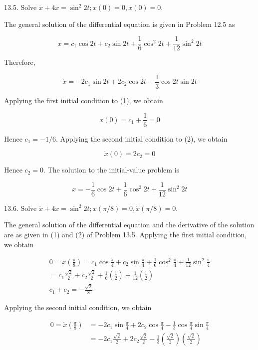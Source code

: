 \documentclass[10pt]{article}
\begin{document}
13.5. Solve $\ddot{x}+4 x=\sin ^{2} 2 t ; x(0)=0, \dot{x}(0)=0$.

The general solution of the differential equation is given in Problem 12.5 as


\begin{equation*}
x=c_{1} \cos 2 t+c_{2} \sin 2 t+\frac{1}{6} \cos ^{2} 2 t+\frac{1}{12} \sin ^{2} 2 t \tag{1}
\end{equation*}


Therefore,


\begin{equation*}
\dot{x}=-2 c_{1} \sin 2 t+2 c_{2} \cos 2 t-\frac{1}{3} \cos 2 t \sin 2 t \tag{2}
\end{equation*}


Applying the first initial condition to (1), we obtain

$$
x(0)=c_{1}+\frac{1}{6}=0
$$

Hence $c_{1}=-1 / 6$. Applying the second initial condition to (2), we obtain

$$
\dot{x}(0)=2 c_{2}=0
$$

Hence $c_{2}=0$. The solution to the initial-value problem is

$$
x=-\frac{1}{6} \cos 2 t+\frac{1}{6} \cos ^{2} 2 t+\frac{1}{12} \sin ^{2} 2 t
$$

13.6. Solve $\ddot{x}+4 x=\sin ^{2} 2 t ; x(\pi / 8)=0, \dot{x}(\pi / 8)=0$.

The general solution of the differential equation and the derivative of the solution are as given in (1) and (2) of Problem 13.5. Applying the first initial condition, we obtain


\begin{gather*}
0=x\left(\frac{\pi}{8}\right)=c_{1} \cos \frac{\pi}{4}+c_{2} \sin \frac{\pi}{4}+\frac{1}{6} \cos ^{2} \frac{\pi}{4}+\frac{1}{12} \sin ^{2} \frac{\pi}{4} \\
=c_{1} \frac{\sqrt{2}}{2}+c_{2} \frac{\sqrt{2}}{2}+\frac{1}{6}\left(\frac{1}{2}\right)+\frac{1}{12}\left(\frac{1}{2}\right) \\
c_{1}+c_{2}=-\frac{\sqrt{2}}{8} \tag{1}
\end{gather*}


Applying the second initial condition, we obtain

$$
\begin{aligned}
0=\dot{x}\left(\frac{\pi}{8}\right) & =-2 c_{1} \sin \frac{\pi}{4}+2 c_{2} \cos \frac{\pi}{4}-\frac{1}{3} \cos \frac{\pi}{4} \sin \frac{\pi}{4} \\
& =-2 c_{1} \frac{\sqrt{2}}{2}+2 c_{2} \frac{\sqrt{2}}{2}-\frac{1}{3}\left(\frac{\sqrt{2}}{2}\right)\left(\frac{\sqrt{2}}{2}\right)
\end{aligned}
$$
\end{document}
